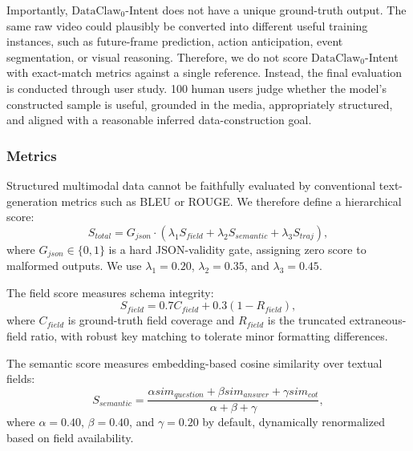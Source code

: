 \documentclass{llmxive}
\begin{document}
Importantly, $\text{DataClaw}_0$-Intent does not have a unique ground-truth output. The same raw video could plausibly be converted into different useful training instances, such as future-frame prediction, action anticipation, event segmentation, or visual reasoning. Therefore, we do not score $\text{DataClaw}_0$-Intent with exact-match metrics against a single reference. Instead, the final evaluation is conducted through user study. 100 human users judge whether the model's constructed sample is useful, grounded in the media, appropriately structured, and aligned with a reasonable inferred data-construction goal.


\subsubsection{Metrics}

Structured multimodal data cannot be faithfully evaluated by conventional text-generation metrics such as BLEU or ROUGE. We therefore define a hierarchical score:
\begin{equation}
S_{total}=G_{json}\cdot
(\lambda_1S_{field}+\lambda_2S_{semantic}+\lambda_3S_{traj}),
\end{equation}
where \(G_{json}\in\{0,1\}\) is a hard JSON-validity gate, assigning zero score to malformed outputs. We use \(\lambda_1=0.20\), \(\lambda_2=0.35\), and \(\lambda_3=0.45\).

The field score measures schema integrity:
\begin{equation}
S_{field}=0.7C_{field}+0.3(1-R_{field}),
\end{equation}
where \(C_{field}\) is ground-truth field coverage and \(R_{field}\) is the truncated extraneous-field ratio, with robust key matching to tolerate minor formatting differences.

The semantic score measures embedding-based cosine similarity over textual fields:
\begin{equation}
S_{semantic}
=
\frac{
\alpha sim_{question}+\beta sim_{answer}+\gamma sim_{cot}
}{
\alpha+\beta+\gamma
},
\end{equation}
where \(\alpha=0.40\), \(\beta=0.40\), and \(\gamma=0.20\) by default, dynamically renormalized based on field availability.

\end{document}
